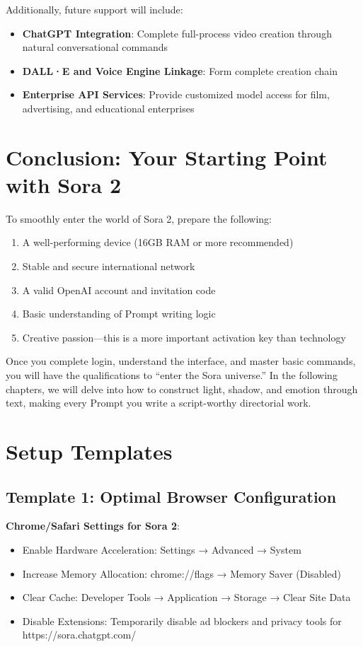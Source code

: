 Additionally, future support will include:

\begin{itemize}
\item \textbf{ChatGPT Integration}: Complete full-process video creation through natural conversational commands
\item \textbf{DALL·E and Voice Engine Linkage}: Form complete creation chain
\item \textbf{Enterprise API Services}: Provide customized model access for film, advertising, and educational enterprises
\end{itemize}

\section{Conclusion: Your Starting Point with Sora 2}

To smoothly enter the world of Sora 2, prepare the following:

\begin{enumerate}
\item A well-performing device (16GB RAM or more recommended)
\item Stable and secure international network
\item A valid OpenAI account and invitation code
\item Basic understanding of Prompt writing logic
\item Creative passion---this is a more important activation key than technology
\end{enumerate}

Once you complete login, understand the interface, and master basic commands, you will have the qualifications to ``enter the Sora universe.'' In the following chapters, we will delve into how to construct light, shadow, and emotion through text, making every Prompt you write a script-worthy directorial work.

\section*{Setup Templates}

\subsection*{Template 1: Optimal Browser Configuration}
\begin{Prompt}
\textbf{Chrome/Safari Settings for Sora 2}:
\begin{itemize}
\item Enable Hardware Acceleration: Settings → Advanced → System
\item Increase Memory Allocation: chrome://flags → Memory Saver (Disabled)
\item Clear Cache: Developer Tools → Application → Storage → Clear Site Data
\item Disable Extensions: Temporarily disable ad blockers and privacy tools for https://sora.chatgpt.com/
\end{itemize}
\end{Prompt}



